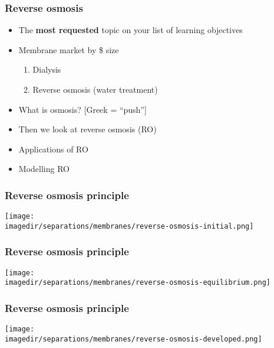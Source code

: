 \begin{frame}\frametitle{Reverse osmosis}
	\begin{itemize}
		\item	The \textbf{most requested} topic on your list of learning objectives
		\item	Membrane market by \$ size
			\begin{enumerate}
				\item	Dialysis
				\item	Reverse osmosis (water treatment)
			\end{enumerate}
		\item	What is osmosis? [Greek = ``push'']
		\item	Then we look at reverse osmosis (RO)
		\item	Applications of RO
		\item	Modelling RO
	\end{itemize}	
\end{frame}

\begin{frame}\frametitle{Reverse osmosis principle}
	\vfill
	\begin{center}
		\texttt{[image: \\imagedir/separations/membranes/reverse-osmosis-initial.png]}
	\end{center}
\end{frame}

\begin{frame}\frametitle{Reverse osmosis principle}
	\vfill
	\begin{center}
		\texttt{[image: \\imagedir/separations/membranes/reverse-osmosis-equilibrium.png]}
	\end{center}
\end{frame}

\begin{frame}\frametitle{Reverse osmosis principle}
	\vfill
	\begin{center}
		\texttt{[image: \\imagedir/separations/membranes/reverse-osmosis-developed.png]}
	\end{center}
\end{frame}

